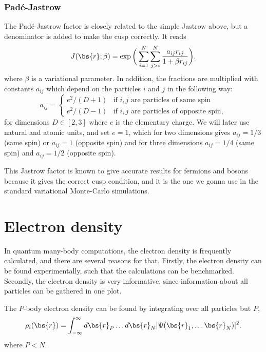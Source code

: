 \subsubsection{Padé-Jastrow}
The Padé-Jastrow factor is closely related to the simple Jastrow above, but a denominator is added to make the cusp correctly. It reads
\begin{equation}
J(\bs{r};\beta) = \exp\bigg(\sum_{i=1}^N\sum_{j>i}^N\frac{a_{ij}r_{ij}}{1+\beta r_{ij}}\bigg).
\label{eq:PadeJastrow}
\end{equation}
where $\beta$ is a variational parameter. In addition, the fractions are multiplied with constants $a_{ij}$ which depend on the particles $i$ and $j$ in the following way:
\begin{equation}
\label{eq:ajastrow}
a_{ij}=
\begin{cases} 
e^2/(D+1) & \text{if $i,j$ are particles of same spin} \\
e^2/(D-1) & \text{if $i,j$ are particles of opposite spin},
\end{cases}
\end{equation}
for dimensions $D\in[2,3]$ where $e$ is the elementary charge. We will later use natural and atomic units, and set $e=1$, which for two dimensions gives $a_{ij}=1/3$ (same spin) or $a_{ij}=1$ (opposite spin) and for three dimensions $a_{ij}=1/4$ (same spin) and $a_{ij}=1/2$ (opposite spin).

This Jastrow factor is known to give accurate results for fermions and bosons because it gives the correct cusp condition, and it is the one we gonna use in the standard variational Monte-Carlo simulations.

\section{Electron density}
In quantum many-body computations, the electron density is frequently calculated, and there are several reasons for that. Firstly, the electron density can be found experimentally, such that the calculations can be benchmarked. Secondly, the electron density is very informative, since information about all particles can be gathered in one plot.

The $P$-body electron density can be found by integrating over all particles but $P$, 
\begin{equation}
\label{eq:electron_density}
\rho_i(\bs{r})=\int_{-\infty}^{\infty}d\bs{r}_P\hdots d\bs{r}_N |\Psi(\bs{r}_1,\hdots \bs{r}_N)|^2.
\end{equation}
where $P<N$.

